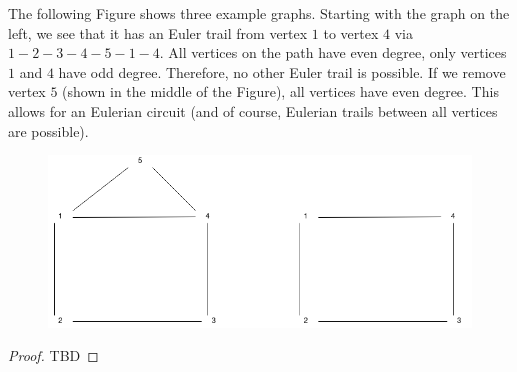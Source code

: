 The following Figure shows three example graphs. Starting with the graph on the left, we see that it has an Euler trail from vertex $1$ to vertex $4$ via $1-2-3-4-5-1-4$. All vertices on the path have even degree, only vertices $1$ and $4$ have odd degree. Therefore, no other Euler trail is possible. If we remove vertex $5$ (shown in the middle of the Figure), all vertices have even degree. This allows for an Eulerian circuit (and of course, Eulerian trails between all vertices are possible).

\begin{figure}[H]
\centering
\includegraphics[scale=0.4]{images/graphs_04_10.png}
\end{figure}


\begin{proof}
TBD
\end{proof}


